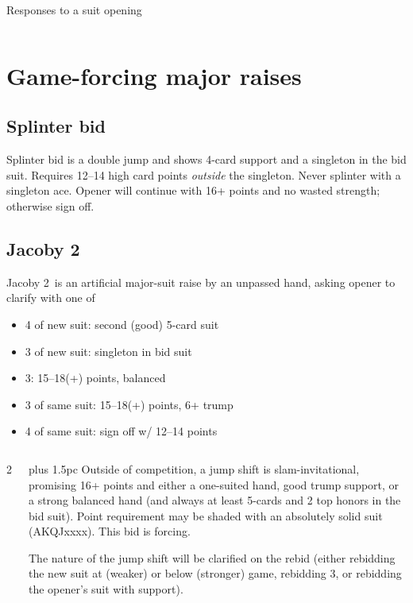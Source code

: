 \begin{sheet}{Responses to a suit opening}
\begin{columns}
\begin{column}
\section{Game-forcing major raises}
\subsection{Splinter bid}
Splinter bid is a double jump and shows
4-card support and a singleton in the bid suit.
Requires 12--14 high card points \emph{outside}
the singleton.  Never splinter with a singleton
ace.  Opener will continue with 16+ points and
no wasted strength; otherwise sign off.

\subsection{Jacoby 2\nt}
Jacoby 2\nt\ is an artificial major-suit raise
by an unpassed hand, asking opener to clarify with one of
\begin{itemize}\itemsep-4pt
\item 4 of new suit: second (good) 5-card suit
\item 3 of new suit: singleton in bid suit
\item 3\nt: 15--18(+) points, balanced
\item 3 of same suit: 15--18(+) points, 6+ trump
\item 4 of same suit: sign off w/ 12--14 points
\end{itemize}
\end{column}
\end{columns}


\begin{columns}2
\begin{column}
\rightskip=0pt plus 1.5pc 
\noindent Outside of competition, a jump shift is slam-invitational,
promising 16+ points and either a one-suited hand, good trump support,
or a strong balanced hand (and always at least 5-cards and 2 top
honors in the bid suit).  Point requirement may be shaded with an
absolutely solid suit (AKQJxxxx).  This bid is forcing.

\noindent The nature of the jump shift will be clarified
on the rebid (either rebidding the new suit at (weaker) or
below (stronger) game, rebidding 3\nt, or rebidding the
opener's suit with support).

\end{column}


\end{columns}
\end{sheet}
